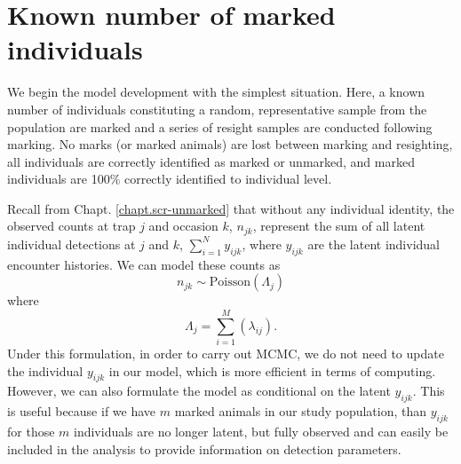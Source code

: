 \section{Known number of marked individuals}

We begin the model development with the simplest situation. Here, a known number of
individuals constituting a random, representative sample from the
population %
are marked and a series of resight samples are conducted
following marking. No marks (or marked animals) are lost between
marking and resighting, all individuals are correctly identified as
marked or unmarked, and marked individuals are 100\% correctly
identified to individual level.

Recall from Chapt. \ref{chapt.scr-unmarked} that without any individual identity, the observed counts at trap
$j$ and occasion $k$, $n_{jk}$, represent the sum of all latent
individual detections at $j$ and $k$,
$\displaystyle\sum\limits_{i=1}^{N} y_{ijk}$, where $y_{ijk}$ are the
latent individual encounter histories.
We can model these counts as
\[
n_{jk} \sim \mbox{Poisson}( \Lambda_{j} )
\]
where
\[
\Lambda_{j} = \sum_{i=1}^{M}( \lambda_{ij} ).
\]
Under this formulation, in order to carry out MCMC,
 we do not need to update the individual
$y_{ijk}$ in our model, which  is more efficient in terms of
computing. However, we can also formulate the model as conditional on
the latent $y_{ijk}$. This is useful because if we have $m$
marked animals in our study population, than $y_{ijk}$ for
those $m$ individuals are no longer latent, but fully observed and can easily be
included in the analysis to provide information on detection parameters.

